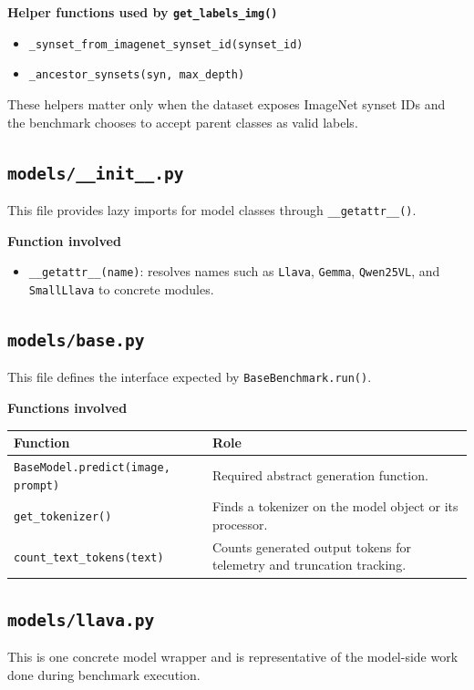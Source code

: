 \documentclass[11pt]{article}
\begin{document}
\textbf{Helper functions used by \texttt{get\_labels\_img()}}
\begin{itemize}[leftmargin=*]
    \item \texttt{\_synset\_from\_imagenet\_synset\_id(synset\_id)}
    \item \texttt{\_ancestor\_synsets(syn, max\_depth)}
\end{itemize}

These helpers matter only when the dataset exposes ImageNet synset IDs and the benchmark chooses to accept parent classes as valid labels.

\subsection*{\texttt{models/\_\_init\_\_.py}}
This file provides lazy imports for model classes through \texttt{\_\_getattr\_\_()}.

\textbf{Function involved}
\begin{itemize}[leftmargin=*]
    \item \texttt{\_\_getattr\_\_(name)}: resolves names such as \texttt{Llava}, \texttt{Gemma}, \texttt{Qwen25VL}, and \texttt{SmallLlava} to concrete modules.
\end{itemize}

\subsection*{\texttt{models/base.py}}
This file defines the interface expected by \texttt{BaseBenchmark.run()}.

\textbf{Functions involved}
\begin{longtable}{>{\ttfamily}p{}p{}}
\textnormal{Function} & \textnormal{Role} \\
\hline
\texttt{BaseModel.predict(image, prompt)} & Required abstract generation function. \\
\texttt{get\_tokenizer()} & Finds a tokenizer on the model object or its processor. \\
\texttt{count\_text\_tokens(text)} & Counts generated output tokens for telemetry and truncation tracking. \\
\end{longtable}

\subsection*{\texttt{models/llava.py}}
This is one concrete model wrapper and is representative of the model-side work done during benchmark execution.
\end{document}
